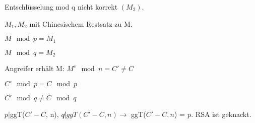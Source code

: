   Entschlüsselung mod q nicht korrekt $(M_2)$.

  $M_1, M_2$ mit Chinesischem Restsatz zu M.

  $M \mod p = M_1$

  $M \mod q = M_2$

  \par \medskip

  Angreifer erhält M: $M^e \mod n = C' \neq C$

  $C' \mod p = C \mod p$
  
  $C' \mod q \neq C \mod q$

  \par \medskip


  $p |$ggT($C' - C$, n), $q \not | ggT(C'- C, n) \rightarrow$ ggT($C' - C, n$) = p. RSA ist geknackt.